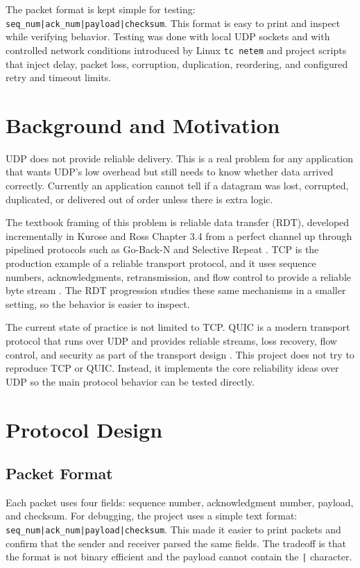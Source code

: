 \documentclass[conference]{IEEEtran}
\begin{document}
The packet format is kept simple for testing:
\texttt{seq\_num\allowbreak|\allowbreak ack\_num\allowbreak|\allowbreak payload\allowbreak|\allowbreak checksum}.
This format is easy to print and inspect while verifying behavior.
Testing was done with local UDP sockets and with controlled network conditions
introduced by Linux \texttt{tc netem} and project scripts that inject delay,
packet loss, corruption, duplication, reordering, and configured retry and
timeout limits.
\section{Background and Motivation}
UDP does not provide reliable delivery. This is a real problem for any application that wants UDP's low overhead but still needs to know whether data arrived correctly. Currently an application cannot tell if a datagram was lost, corrupted, duplicated, or delivered out of order unless there is extra logic.

The textbook framing of this problem is reliable data transfer (RDT), developed
incrementally in Kurose and Ross Chapter 3.4 from a perfect channel up through
pipelined protocols such as Go-Back-N and Selective Repeat \cite{b3}. TCP is the
production example of a reliable transport protocol, and it uses sequence
numbers, acknowledgments, retransmission, and flow control to provide a
reliable byte stream \cite{b1}. The RDT progression studies these same
mechanisms in a smaller setting, so the behavior is easier to inspect.

The current state of practice is not limited to TCP. QUIC is a modern transport
protocol that runs over UDP and provides reliable streams, loss recovery, flow
control, and security as part of the transport design \cite{b2}. This project
does not try to reproduce TCP or QUIC. Instead, it implements the core reliability
ideas over UDP so the main protocol behavior can be tested directly.
\section{Protocol Design}

\subsection{Packet Format}
Each packet uses four fields: sequence number, acknowledgment number, payload,
and checksum. For debugging, the project uses a simple text format:
\texttt{seq\_num|ack\_num|payload|checksum}. This made it easier to print
packets and confirm that the sender and receiver parsed the same fields. The
tradeoff is that the format is not binary efficient and the payload cannot
contain the \texttt{|} character.
\end{document}
